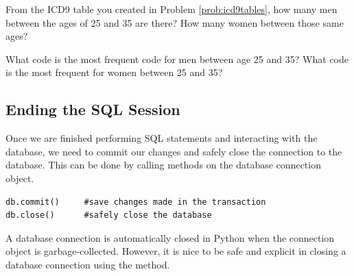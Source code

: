 \begin{problem}
From the ICD9 table you created in Problem \ref{prob:icd9tables}, how many men between the ages of 25 and 35 are there?  How many women between those same ages?

What code is the most frequent code for men between age 25 and 35? What code is the most frequent for women between 25 and 35?  
\label{prob:youngfreqcodes}
\end{problem}

\subsection*{Ending the SQL Session}
Once we are finished performing SQL statements and interacting with the database, we need to commit our changes and safely close the connection
to the database.
This can be done by calling methods on the database connection object.
\begin{lstlisting}
db.commit()     #save changes made in the transaction
db.close()      #safely close the database
\end{lstlisting}

A database connection is automatically closed in Python when the connection object is garbage-collected.  However, it is nice to be safe and explicit in closing a database connection using the  method.

\let\undefined\lsql 